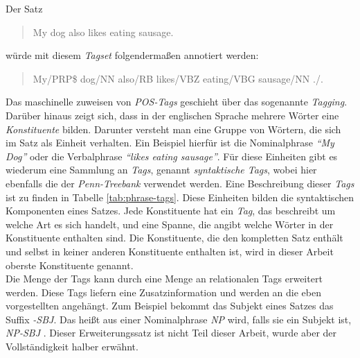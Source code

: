 Der Satz
\begin{quote}
My dog also likes eating sausage.
\end{quote}
würde mit diesem \textit{Tagset} folgendermaßen annotiert werden:
\begin{quote}
My/PRP\$ dog/NN also/RB likes/VBZ eating/VBG sausage/NN ./.
\end{quote}
Das maschinelle zuweisen von \textit{POS-Tags} geschieht über das sogenannte \textit{Tagging}. \\
Darüber hinaus zeigt sich, dass in der englischen Sprache mehrere Wörter eine \textit{Konstituente} bilden. Darunter versteht man eine Gruppe von Wörtern, die sich im Satz als Einheit verhalten. Ein Beispiel hierfür ist die Nominalphrase \textit{``My Dog''} oder die Verbalphrase \textit{``likes eating sausage''}. Für diese Einheiten gibt es wiederum eine Sammlung an \textit{Tags}, genannt \textit{syntaktische Tags}, wobei hier ebenfalls die der \textit{Penn-Treebank} verwendet werden. Eine Beschreibung dieser \textit{Tags} ist zu finden in Tabelle \ref{tab:phrase-tags}. Diese Einheiten bilden die syntaktischen Komponenten eines Satzes. Jede Konstituente hat ein \textit{Tag}, das beschreibt um welche Art es sich handelt, und eine Spanne, die angibt welche Wörter in der Konstituente enthalten sind. Die Konstituente, die den kompletten Satz enthält und selbst in keiner anderen Konstituente enthalten ist, wird in dieser Arbeit oberste Konstituente genannt. \\
Die Menge der Tags  kann durch eine Menge an relationalen Tags erweitert werden. Diese Tags liefern eine Zusatzinformation und werden an die eben vorgestellten angehängt. Zum Beispiel bekommt das Subjekt eines Satzes das Suffix \textit{-SBJ}. Das heißt aus einer Nominalphrase \textit{NP} wird, falls sie ein Subjekt ist, \textit{NP-SBJ} \cite{relationaltags}. Dieser Erweiterungssatz ist nicht Teil dieser Arbeit, wurde aber der Vollständigkeit halber erwähnt.
